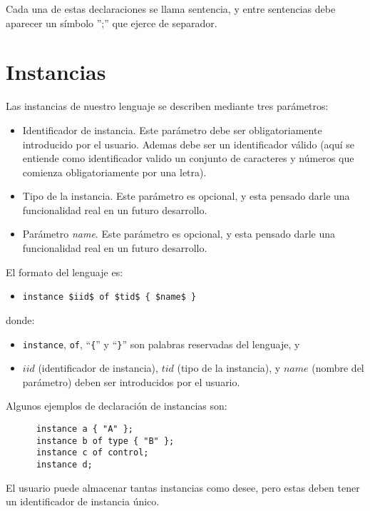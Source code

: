 Cada una de estas declaraciones se llama sentencia, y entre sentencias
debe aparecer un símbolo '';'' que ejerce de separador.

\section{Instancias}\label{sec:Instancias}

Las instancias de nuestro lenguaje se describen mediante tres
parámetros:

\begin{itemize}
\item Identificador de instancia. Este parámetro debe ser
  obligatoriamente introducido por el usuario. Ademas debe ser un
  identificador válido (aquí se entiende como identificador valido un
  conjunto de caracteres y números que comienza obligatoriamente por
  una letra).
\item Tipo de la instancia. Este parámetro es opcional, y esta pensado
  darle una funcionalidad real en un futuro desarrollo.
\item Parámetro \textit{name}. Este parámetro es opcional, y esta
  pensado darle una funcionalidad real en un futuro desarrollo.
\end{itemize}

El formato del lenguaje es:

\begin{itemize}
\item \lstinline[mathescape]!instance $iid$ of $tid$ { $name$ }!
\end{itemize}
donde:
\begin{itemize}
\item \lstinline{instance}, \lstinline{of}, ``\lstinline!{!'' y
    ``\lstinline!}!'' son palabras reservadas del lenguaje, y
\item $iid$ (identificador de instancia), $tid$ (tipo de la
  instancia), y $name$ (nombre del parámetro) deben ser introducidos
  por el usuario.
\end{itemize}

Algunos ejemplos de declaración de instancias son:

\begin{lstlisting}
      instance a { "A" };
      instance b of type { "B" };
      instance c of control;
      instance d;
\end{lstlisting}

El usuario puede almacenar tantas instancias como desee, pero estas
deben tener un identificador de instancia único.

